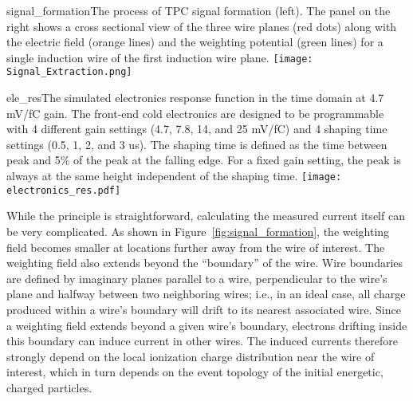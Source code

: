 \begin{cdrfigure}{signal_formation}{The process of TPC signal formation (left). The panel on the 
right shows a cross sectional view of the three wire planes (red dots) along with the electric field (orange lines) and the weighting potential 
(green lines) for a single induction wire of the first induction wire plane.}
\texttt{[image: Signal\_Extraction.png]}
\end{cdrfigure}

\begin{cdrfigure}{ele_res}{The simulated electronics response function in the time 
domain at 4.7 mV/fC gain. The front-end cold electronics are designed to be 
programmable with 4 different gain settings (4.7, 7.8, 14, and 25 mV/fC) and 
4 shaping time settings (0.5, 1, 2, and 3 us). The shaping time is defined as the time 
between peak and 5\% of the peak at the falling edge. For a fixed gain setting, 
the peak is always at the same height independent of the shaping time. }
\texttt{[image: electronics\_res.pdf]}
\end{cdrfigure}


While the principle is straightforward, calculating the measured
current itself can be very complicated. As shown in
Figure~\ref{fig:signal_formation}, the weighting field becomes smaller
at locations further away from the wire of interest.  
The weighting field also extends beyond the ``boundary'' of the wire.
Wire boundaries are defined by imaginary planes parallel to a wire,
perpendicular to the wire's plane and halfway between two neighboring
wires; i.e.,  in an ideal case, all charge produced within a wire's boundary
will drift to its nearest associated wire. 
Since a weighting field extends beyond a given wire's boundary, electrons drifting inside
this boundary can induce current in other wires.  
The induced currents therefore strongly depend on the local ionization
charge distribution near the wire of interest, which in turn depends
on the event topology of the initial energetic, charged particles.


